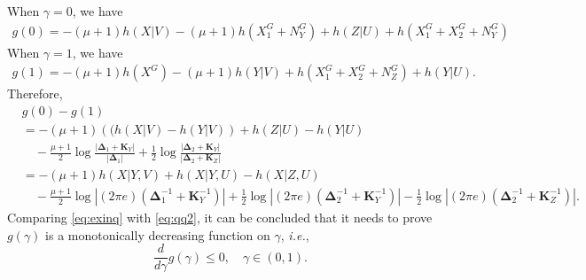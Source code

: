 \documentclass[journal,final, onecolumn]{IEEEtran}
\begin{document}
When $\gamma=0$, we have
\begin{align}
g(0)=-(\mu+1)h\left( X |V      \right) - (\mu+1)h(X_{1}^{G} + N_{Y}^{G})+h(Z|U)+h(X_{1}^{G}+X_{2}^{G} + N_{Y}^{G})
\end{align}
When $\gamma=1$, we have
\begin{align}
g(1)=-(\mu+1)h(X^{G})-(\mu+1)h(Y|V)+h(X_{1}^{G}+X_{2}^{G}+N_{Z}^{G})+h(Y|U).
\end{align}
Therefore,
\begin{align}
&g(0)-g(1) \nonumber \\
&=-(\mu+1)\left((h(X|V)-h(Y|V)\right)+h(Z|U)-h(Y|U)\nonumber \\
& \quad -\frac{\mu+1}{2} \log \frac {\left|  \boldsymbol{\Delta}_{1} + \boldsymbol{K}_{Y}   \right|}{\left|  \boldsymbol{\Delta}_{1} \right|} +\frac{1}{2} \log \frac {\left|  \boldsymbol{\Delta}_{2} + \boldsymbol{K}_{Y}   \right|}{\left|  \boldsymbol{\Delta}_{2} +\boldsymbol{K}_{Z} \right|} \\
&=-(\mu+1) h(X|Y,V)+h(X|Y,U)-h(X|Z,U)\nonumber \\
& \quad -\frac{\mu+1}{2} \log \left| (2 \pi e) \left(    \boldsymbol{\Delta}^{-1}_{1} + \boldsymbol{K}^{-1}_{Y}    \right)    \right| + \frac{1}{2} \log \left| (2 \pi e) \left(    \boldsymbol{\Delta}^{-1}_{2} + \boldsymbol{K}^{-1}_{Y}    \right)    \right|- \frac{1}{2} \log \left| (2 \pi e) \left(    \boldsymbol{\Delta}^{-1}_{2} + \boldsymbol{K}^{-1}_{Z}    \right)    \right|.\label{eq:qq2}
\end{align}
Comparing \eqref{eq:exinq} with \eqref{eq:qq2}, it can be concluded that it needs to prove $g(\gamma)$ is a monotonically decreasing function on $\gamma$, \emph{i.e.},
\begin{equation}
\frac{d}{d\gamma}g(\gamma) \leq 0, \quad \gamma \in (0,1).
\end{equation}
\end{document}
